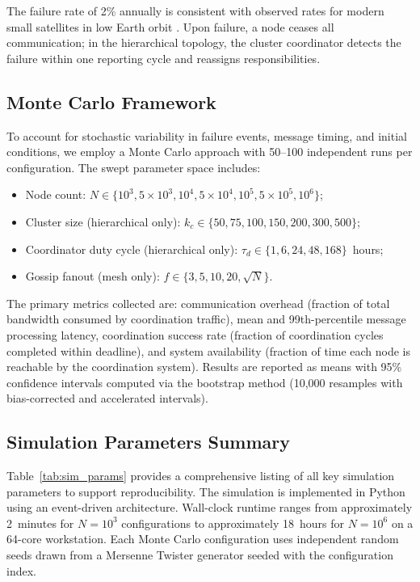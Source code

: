 \documentclass[journal]{IEEEtran}
\begin{document}
The failure rate of 2\% annually is consistent with observed rates for modern small satellites in low Earth orbit \cite{castet_smallsat_reliability}. Upon failure, a node ceases all communication; in the hierarchical topology, the cluster coordinator detects the failure within one reporting cycle and reassigns responsibilities.

\subsection{Monte Carlo Framework}

To account for stochastic variability in failure events, message timing, and initial conditions, we employ a Monte Carlo approach with 50--100 independent runs per configuration. The swept parameter space includes:

\begin{itemize}
    \item Node count: $N \in \{10^3, 5 \times 10^3, 10^4, 5 \times 10^4, 10^5, 5 \times 10^5, 10^6\}$;
    \item Cluster size (hierarchical only): $k_c \in \{50, 75, 100, 150, 200, 300, 500\}$;
    \item Coordinator duty cycle (hierarchical only): $\tau_d \in \{1, 6, 24, 48, 168\}$~hours;
    \item Gossip fanout (mesh only): $f \in \{3, 5, 10, 20, \sqrt{N}\}$.
\end{itemize}

The primary metrics collected are: communication overhead (fraction of total bandwidth consumed by coordination traffic), mean and 99th-percentile message processing latency, coordination success rate (fraction of coordination cycles completed within deadline), and system availability (fraction of time each node is reachable by the coordination system). Results are reported as means with 95\% confidence intervals computed via the bootstrap method (10{,}000 resamples with bias-corrected and accelerated intervals).

\subsection{Simulation Parameters Summary}

Table~\ref{tab:sim_params} provides a comprehensive listing of all key simulation parameters to support reproducibility. The simulation is implemented in Python using an event-driven architecture. Wall-clock runtime ranges from approximately 2~minutes for $N = 10^3$ configurations to approximately 18~hours for $N = 10^6$ on a 64-core workstation. Each Monte Carlo configuration uses independent random seeds drawn from a Mersenne Twister generator seeded with the configuration index.
\end{document}
